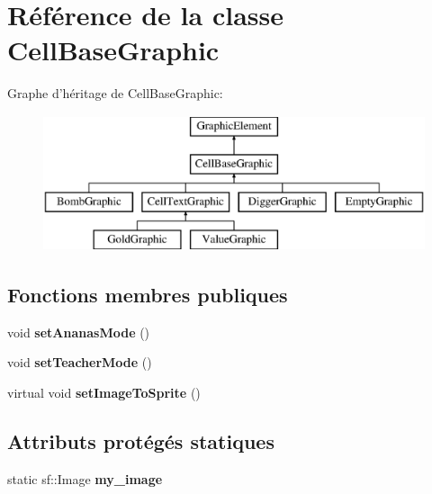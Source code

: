 \hypertarget{class_cell_base_graphic}{\section{Référence de la classe Cell\-Base\-Graphic}
\label{class_cell_base_graphic}
}
Graphe d'héritage de Cell\-Base\-Graphic\-:\begin{figure}[H]
\begin{center}
\leavevmode
\includegraphics[height=4.000000cm]{class_cell_base_graphic}
\end{center}
\end{figure}
\subsection*{Fonctions membres publiques}
\begin{DoxyCompactItemize}
\item 
\hypertarget{class_cell_base_graphic_a8098385db84f6db111d2f3223f3d4a06}{void {\bfseries set\-Ananas\-Mode} ()}\label{class_cell_base_graphic_a8098385db84f6db111d2f3223f3d4a06}

\item 
\hypertarget{class_cell_base_graphic_a42d524a8413fcdd6af45a255b2a729f6}{void {\bfseries set\-Teacher\-Mode} ()}\label{class_cell_base_graphic_a42d524a8413fcdd6af45a255b2a729f6}

\item 
\hypertarget{class_cell_base_graphic_a4cb2ea2e3e7543a6c71ad1c189f980fe}{virtual void {\bfseries set\-Image\-To\-Sprite} ()}\label{class_cell_base_graphic_a4cb2ea2e3e7543a6c71ad1c189f980fe}

\end{DoxyCompactItemize}
\subsection*{Attributs protégés statiques}
\begin{DoxyCompactItemize}
\item 
\hypertarget{class_cell_base_graphic_a2005f0c436ef5192da542cb2d4bd1f4c}{static sf\-::\-Image {\bfseries my\-\_\-image}}\label{class_cell_base_graphic_a2005f0c436ef5192da542cb2d4bd1f4c}

\end{DoxyCompactItemize}
